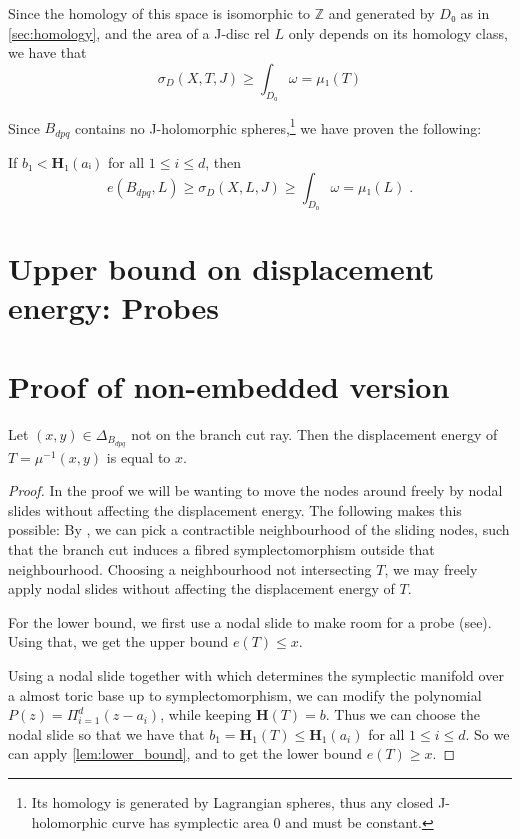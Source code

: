 \documentclass[12pt,a4paper,draft]{scrartcl}
\begin{document}
Since the homology of this space is isomorphic to $ℤ$ and generated by $D₀$ as in \cref{sec:homology}, and the area of a J-disc rel $L$ only depends on its homology class, we have that
\[σ_D(X,T,J) ≥ ∫_{D₀} ω  = μ₁(T)\]

Since $B_{dpq}$ contains no J-holomorphic spheres,\footnote{Its homology is generated by Lagrangian spheres, thus any closed J-holomorphic curve has symplectic area $0$ and must be constant.} we have proven the following:

\begin{lemma}
  \label{lem:lower_bound}
  If $b₁ < \symbf{H}₁(aᵢ)$ for all $1 ≤ i ≤ d$, then
  \[e(B_{dpq},L) ≥ σ_D(X,L,J) ≥ ∫_{D₀} ω  = μ₁(L) \; .\]
\end{lemma}

\section{Upper bound on displacement energy: Probes}

\section{Proof of non-embedded version}


\begin{lemma}
  \label{lem:bdq_displacement}
  Let $(x,y) ∈ Δ_{B_{dpq}}$ not on the branch cut ray. Then the displacement energy of $T = μ^{-1}(x,y)$ is equal to $x$.
\end{lemma}

\begin{proof}
  In the proof we will be wanting to move the nodes around freely by nodal slides without affecting the displacement energy. The following makes this possible:
  By \cite[Theorem 8.9]{evans2021atfs}, we can pick a contractible neighbourhood of the sliding nodes, such that the branch cut induces a fibred symplectomorphism outside that neighbourhood. Choosing a neighbourhood not intersecting $T$, we may freely apply nodal slides without affecting the displacement energy of $T$.

  For the lower bound, we first use a nodal slide to make room for a probe (see). Using that, we get the upper bound $e(T)≤x$.
  
  Using a nodal slide together with \cite[Corollary 5.4]{symington2002FourDF} which determines the symplectic manifold over a almost toric base up to symplectomorphism, we can modify the polynomial $P(z) = Π_{i=1}^d (z-a_i)$, while keeping $\symbf{H}(T) = {b}$.
  Thus we can choose the nodal slide so that we have that $b_1 = \symbf{H}_1(T) ≤ \symbf{H}_1(a_i)$ for all $ 1 ≤ i ≤ d$.
  So we can apply \cref{lem:lower_bound}, and to get the lower bound $e(T) ≥ x$.
\end{proof}
\end{document}
